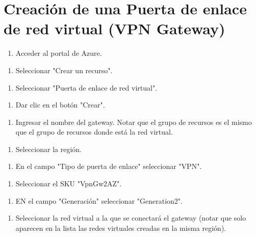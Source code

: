 \section{Creación de una Puerta de enlace de red virtual (VPN Gateway)}

\begin{enumerate}
\item Acceder al portal de Azure.
\end{enumerate}

\begin{enumerate}
\item Seleccionar "Crear un recurso".
\end{enumerate}

\begin{enumerate}
\item Seleccionar "Puerta de enlace de red virtual".
\end{enumerate}

\begin{enumerate}
\item Dar clic en el botón "Crear".
\end{enumerate}

\begin{enumerate}
\item Ingresar el nombre del gateway. Notar que el grupo de recursos es el mismo que el grupo de recursos donde está la red virtual.
\end{enumerate}

\begin{enumerate}
\item Seleccionar la región.
\end{enumerate}

\begin{enumerate}
\item En el campo "Tipo de puerta de enlace" seleccionar "VPN".
\end{enumerate}

\begin{enumerate}
\item Seleccionar el SKU "VpnGw2AZ".
\end{enumerate}

\begin{enumerate}
\item EN el campo "Generación" seleccionar "Generation2".
\end{enumerate}

\begin{enumerate}
\item Seleccionar la red virtual a la que se conectará el gateway (notar que solo aparecen en la lista las redes virtuales creadas en la misma región).
\end{enumerate}

